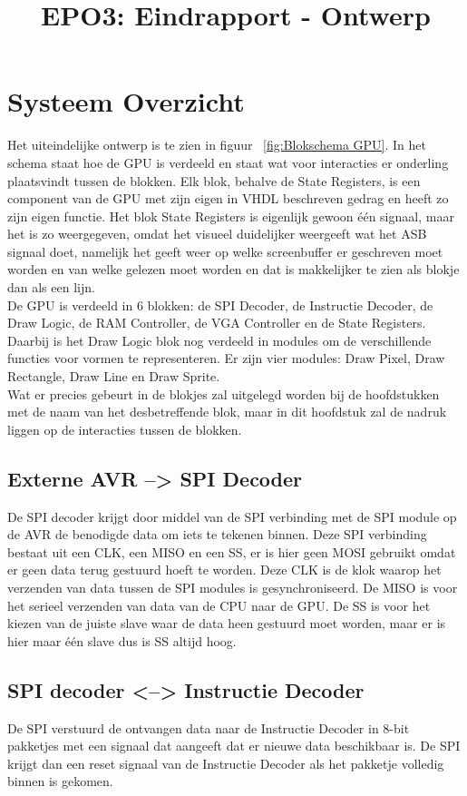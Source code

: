 \documentclass{scrartcl} %
\author{}
\title{EPO3: Eindrapport - Ontwerp}
\begin{document}
\chapter{Systeem Overzicht}
\label{ch:ontwerp}

Het uiteindelijke ontwerp is te zien in figuur ~\ref{fig:Blokschema GPU}. In het schema staat hoe de GPU is verdeeld en staat wat voor interacties er onderling plaatsvindt tussen de blokken.
Elk blok, behalve de State Registers, is een component van de GPU met zijn eigen in VHDL beschreven gedrag en heeft zo zijn eigen functie. Het blok State Registers is eigenlijk gewoon één signaal, maar het is zo weergegeven, omdat het visueel duidelijker weergeeft wat het ASB signaal doet, namelijk het geeft weer op welke screenbuffer er geschreven moet worden en van welke gelezen moet worden en dat is makkelijker te zien als blokje dan als een lijn. 
\\ De GPU is verdeeld in 6 blokken: de SPI Decoder, de Instructie Decoder, de Draw Logic, de RAM Controller, de VGA Controller en de State Registers. Daarbij is het Draw Logic blok nog verdeeld in modules om de verschillende functies voor vormen te representeren. Er zijn vier modules: Draw Pixel, Draw Rectangle, Draw Line en Draw Sprite.
\\Wat er precies gebeurt in de blokjes zal uitgelegd worden bij de hoofdstukken met de naam van het desbetreffende blok, maar in dit hoofdstuk zal de nadruk liggen op de interacties tussen de blokken.

\section{Externe AVR --> SPI Decoder}
De SPI decoder krijgt door middel van de SPI verbinding met de SPI module op de AVR de benodigde data om iets te tekenen binnen. Deze SPI verbinding bestaat uit een CLK, een MISO en een SS, er is hier geen MOSI gebruikt omdat er geen data terug gestuurd hoeft te worden. Deze CLK is de klok waarop het verzenden van data tussen de SPI modules is gesynchroniseerd. De MISO is voor het serieel verzenden van data van de CPU naar de GPU. De SS is voor het kiezen van de juiste slave waar de data heen gestuurd moet worden, maar er is hier maar één slave dus is SS altijd hoog.

\section{SPI decoder <--> Instructie Decoder}
De SPI verstuurd de ontvangen data naar de Instructie Decoder in 8-bit pakketjes met een signaal dat aangeeft dat er nieuwe data beschikbaar is. De SPI krijgt dan een reset signaal van de Instructie Decoder als het pakketje volledig binnen is gekomen.
\end{document}
